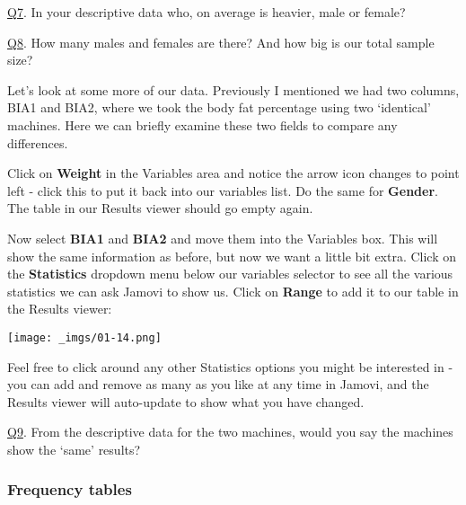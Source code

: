 \documentclass[
  letterpaper,
  DIV=11,
  numbers=noendperiod]{scrartcl}
\begin{document}
\begin{tcolorbox}[beforeafter skip=1cm, ignore nobreak=true, breakable, colframe=Questions-frame, colback=Questions-bg, coltext=Questions-text, boxsep=2mm, arc=0mm, boxrule=0.5mm]

\protect\hypertarget{Q7}{\protect\hyperlink{A7}{Q7}}. In your
descriptive data who, on average is heavier, male or female?

\protect\hypertarget{Q8}{\protect\hyperlink{A8}{Q8}}. How many males and
females are there? And how big is our total sample size?

\end{tcolorbox}

Let's look at some more of our data. Previously I mentioned we had two
columns, BIA1 and BIA2, where we took the body fat percentage using two
`identical' machines. Here we can briefly examine these two fields to
compare any differences.

Click on \textbf{Weight} in the Variables area and notice the arrow icon
changes to point left - click this to put it back into our variables
list. Do the same for \textbf{Gender}. The table in our Results viewer
should go empty again.

Now select \textbf{BIA1} and \textbf{BIA2} and move them into the
Variables box. This will show the same information as before, but now we
want a little bit extra. Click on the \textbf{Statistics} dropdown menu
below our variables selector to see all the various statistics we can
ask Jamovi to show us. Click on \textbf{Range} to add it to our table in
the Results viewer:

\texttt{[image: \_imgs/01-14.png]}

Feel free to click around any other Statistics options you might be
interested in - you can add and remove as many as you like at any time
in Jamovi, and the Results viewer will auto-update to show what you have
changed.

\begin{tcolorbox}[beforeafter skip=1cm, ignore nobreak=true, breakable, colframe=Questions-frame, colback=Questions-bg, coltext=Questions-text, boxsep=2mm, arc=0mm, boxrule=0.5mm]

\protect\hypertarget{Q9}{\protect\hyperlink{A9}{Q9}}. From the
descriptive data for the two machines, would you say the machines show
the `same' results?

\end{tcolorbox}

\hypertarget{frequency-tables}{%
\subsubsection{Frequency tables}\label{frequency-tables}}
\end{document}
